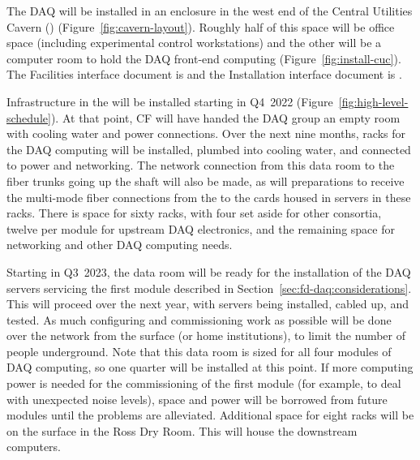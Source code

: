 The DAQ will be installed in an enclosure in the west end of the Central
Utilities Cavern () (Figure~\ref{fig:cavern-layout}).  Roughly
half of this space will be office space (including experimental control
workstations) and the other will be a computer room to hold the DAQ
front-end computing (Figure~\ref{fig:install-cuc}).  The Facilities
interface document is  and the Installation interface
document is .




Infrastructure in the  will be installed starting in Q4~2022
(Figure~\ref{fig:high-level-schedule}).  At that point, CF will have
handed the DAQ group an empty room with cooling water and power
connections.  Over the next nine months, racks for the DAQ computing
will be installed, plumbed into cooling water, and connected to power
and networking.  The network connection from this data room to the fiber
trunks going up the shaft will also be made, as will preparations to
receive the multi-mode fiber connections from the  to the
 cards housed in servers in these racks.  There is space
for sixty racks, with four set aside for other consortia, twelve per
module for upstream DAQ electronics, and the remaining space for
networking and other DAQ computing needs.

Starting in Q3~2023, the data room will be ready for the installation of
the DAQ servers servicing the first module described in
Section~\ref{sec:fd-daq:considerations}.  This will proceed over the
next year, with servers being installed, cabled up, and tested.
As much configuring and commissioning work as possible will be done over
the network from the surface (or home institutions), to limit the number
of people underground.  Note that this data room is sized for all four
modules of DAQ computing, so one quarter will be installed at this
point.  If more computing power is needed for the commissioning of the
first module (for example, to deal with unexpected noise levels), space
and power will be borrowed from future modules until the problems are
alleviated. 
Additional space for eight racks will be on the surface in the Ross Dry
Room.  This will house the downstream  computers.

